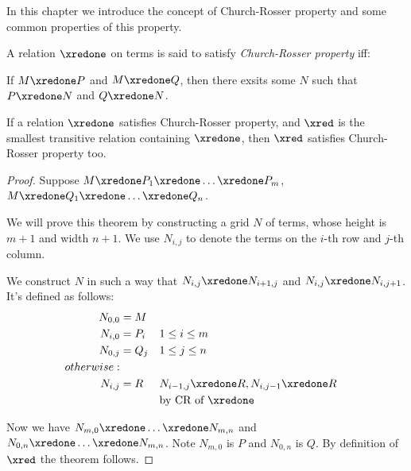 \documentclass[../../../include/open-logic-section]{subfiles}
\begin{document}


In this chapter we introduce the concept of Church-Rosser property and
some common properties of this property.

\begin{defn}
  A relation $\xredone$ on terms is said to satisfy \emph{Church-Rosser
    property} iff:
  
  If $M \xredone P$ and $M \xredone Q$, then there exsits some $N$
  such that $P \xredone N$ and $Q \xredone N$.
\end{defn}

\begin{thm} 
  If a relation $\xredone$ satisfies Church-Rosser property, and $\xred$ is the
  smallest transitive relation containing $\xredone$, then $\xred$ satisfies
  Church-Rosser property too.
\end{thm}
\begin{proof}
  Suppose $M \xredone P_1 \xredone \ldots \xredone P_m$, $M \xredone Q_1
  \xredone \ldots \xredone Q_n$.
  
  We will prove this theorem by constructing a grid $N$ of terms, whose height is $m + 1$ and width $n + 1$. We use $N_{i,j}$ to denote the terms
  on the $i$-th row and $j$-th column.
  
  We construct $N$ in such a way that $N_{i,j} \xredone N_{i+1,j}$ and
  $N_{i,j} \xredone N_{i,j+1}$. It's defined as follows:
  \begin{align*}
    N_{0,0} &= M \\
    N_{i,0} &= P_i && 1 \le i \le m \\
    N_{0,j} &= Q_j && 1 \le j \le n \\
    otherwise: & \\
    N_{i,j} &= R && N_{i-1,j} \xredone R, N_{i,j-1} \xredone R \\
            & && \text{by CR of $\xredone$}
  \end{align*}

  Now we have $N_{m,0} \xredone \ldots \xredone N_{m,n}$ and $N_{0,n}
  \xredone \ldots \xredone N_{m,n}$. Note $N_{m,0}$ is $P$ and $N_{0,n}$
  is $Q$. By definition of $\xred$ the theorem follows.
\end{proof}
\end{document}
